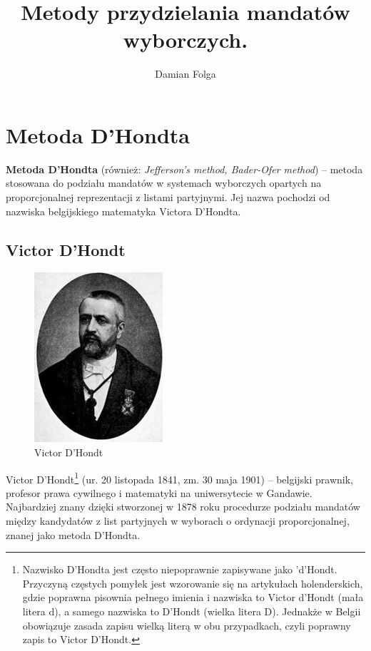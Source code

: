 \documentclass[12pt,a4paper,titlepage]{report}
\author{Damian Folga}
\title{\textbf{Metody przydzielania mandatów wyborczych.}}
\begin{document}
\maketitle
\tableofcontents
\newpage
\chapter{Metoda D'Hondta}
\textbf{Metoda D’Hondta} (również: \textit{Jefferson’s method, Bader-Ofer method}) – metoda stosowana do podziału mandatów w systemach wyborczych opartych na proporcjonalnej reprezentacji z listami partyjnymi. Jej nazwa pochodzi od nazwiska belgijskiego matematyka Victora D’Hondta.
\section{Victor D'Hondt}
\begin{figure}[h]
\includegraphics[scale=0.4]{k.jpg}
\caption{Victor D'Hondt}
\end{figure}
Victor D’Hondt\footnote{ Nazwisko D’Hondta jest często niepoprawnie zapisywane jako 'd’Hondt. Przyczyną częstych pomyłek jest wzorowanie się na artykułach holenderskich, gdzie poprawna pisownia pełnego imienia i nazwiska to Victor d’Hondt (mała litera d), a samego nazwiska to D’Hondt (wielka litera D). Jednakże w Belgii obowiązuje zasada zapisu wielką literą w obu przypadkach, czyli poprawny zapis to Victor D’Hondt.} (ur. 20 listopada 1841, zm. 30 maja 1901) – belgijski prawnik, profesor prawa cywilnego i matematyki na uniwersytecie w Gandawie. Najbardziej znany dzięki stworzonej w 1878 roku procedurze podziału mandatów między kandydatów z list partyjnych w wyborach o ordynacji proporcjonalnej, znanej jako metoda D’Hondta.
\newpage
\end{document}
